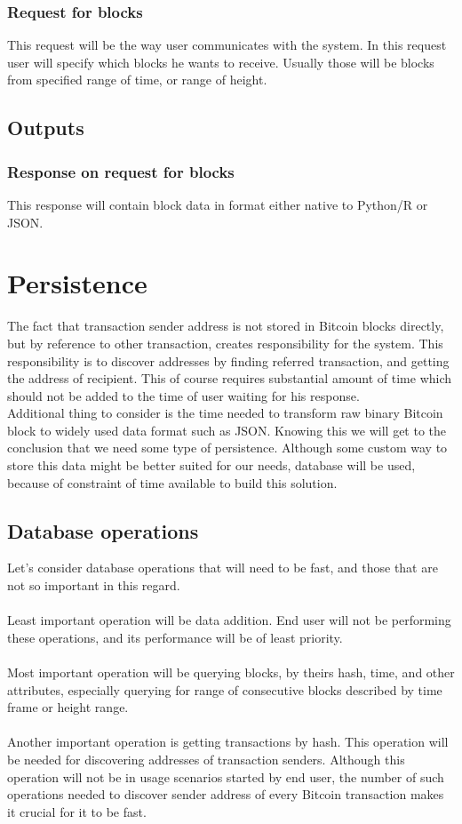 \documentclass[12pt, en, eng, oneside, final]{mgr}
\begin{document}
\subsubsection{Request for blocks} This request will be the way user communicates with the system. In this request user will specify which blocks he wants to receive. Usually those will be blocks from specified range of time, or range of height.

\subsection{Outputs}
\subsubsection{Response on request for blocks} This response will contain block data in format either native to Python/R or JSON.


\section{Persistence}
The fact that transaction sender address is not stored in Bitcoin blocks directly, but by reference to other transaction, creates responsibility for the system. This responsibility is to discover addresses by finding referred transaction, and getting the address of recipient. This of course requires substantial amount of time which should not be added to the time of user waiting for his response. 
\\
Additional thing to consider is the time needed to transform raw binary Bitcoin block to widely used data format such as JSON. Knowing this we will get to the conclusion that we need some type of persistence. Although some custom way to store this data might be better suited for our needs, database will be used, because of constraint of time available to build this solution.

\subsection{Database operations}
Let's consider database operations that will need to be fast, and those that are not so important in this regard.
\\
\\
Least important operation will be data addition. End user will not be performing these operations, and its performance will be of least priority.
\\
\\
Most important operation will be querying blocks, by theirs hash, time, and other attributes, especially querying for range of consecutive blocks described by time frame or height range.
\\
\\
Another important operation is getting transactions by hash. This operation will be needed for discovering addresses of transaction senders. Although this operation will not be in usage scenarios started by end user, the number of such operations needed to discover sender address of every Bitcoin transaction makes it crucial for it to be fast.
\end{document}
